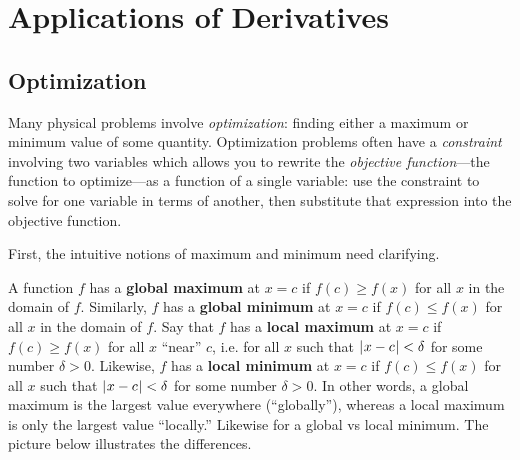 \chapter{Applications of Derivatives}
\section{Optimization}
Many physical problems involve \emph{optimization}: finding either a maximum or
minimum value of some quantity. Optimization
problems often have a \emph{constraint} involving two variables which allows you
to rewrite the \emph{objective function}---the function to optimize---as a
function of a single variable: use the constraint to solve for one variable in
terms of another, then substitute that expression into the
objective function.

First, the intuitive notions of maximum and minimum need clarifying.

 {A function $f$ has a \textbf{global maximum} at $x=c$
if $f(c) \ge f(x)$ for all $x$ in the domain of $f$. Similarly, $f$ has a
\textbf{global minimum} at $x=c$ if $f(c) \le f(x)$ for all $x$ in the domain of
$f$. Say that $f$ has a \textbf{local maximum} at $x=c$ if $f(c) \ge f(x)$ for
all $x$ ``near'' $c$, i.e. for all $x$ such that $\lvert\mspace{1mu}x-c\mspace{1mu}\rvert < \delta$ for some
number $\delta > 0$. Likewise, $f$ has a \textbf{local minimum} at $x=c$ if
$f(c) \le f(x)$ for all $x$ such that $\lvert\mspace{1mu}x-c\mspace{1mu}\rvert < \delta$ for some number
$\delta > 0$.
}
In other words, a global maximum is the largest value everywhere (``globally''),
whereas a local maximum is only the largest value ``locally.'' Likewise for a
global vs local minimum. The picture below illustrates the differences.

